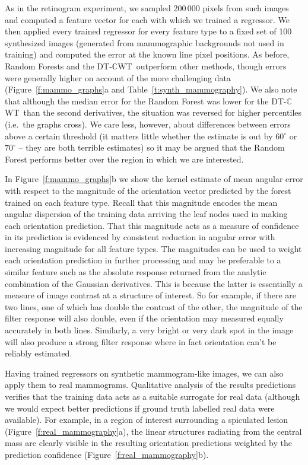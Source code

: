 \documentclass[runningheads,a4paper]{llncs}
\newcommand{\fref}[1]{Figure~\ref{#1}}
\newcommand{\tref}[1]{Table~\ref{#1}}
\def\dtcwt{DT-$\mathbb{C}$WT}
\def\ie{i.e.}
\begin{document}
As in the retinogram experiment, we sampled 200\,000 pixels from such images and computed a feature vector for each with which we trained a regressor. We then applied every trained regressor for every feature type to a fixed set of 100 synthesized images (generated from mammographic backgrounds not used in training)  and computed the error at the known line pixel positions. As before, Random Forests and the \dtcwt~outperform other methods, though errors were generally higher on account of the more challenging data (\fref{f:mammo_graphs}a and \tref{t:synth_mammography}). We also note that although the median error for the Random Forest was lower for the \dtcwt~than the second derivatives, the situation was reversed for higher percentiles (\ie~the graphs cross). We care less, however, about differences between errors above a certain threshold (it matters little whether the estimate is out by $60^\circ$ or $70^\circ$ -- they are both terrible estimates) so it may be argued that the Random Forest performs better over the region in which we are interested.

In \fref{f:mammo_graphs}b we show the kernel estimate of mean angular error with respect to the magnitude of the orientation vector predicted by the forest trained on each feature type. Recall that this magnitude encodes the mean angular dispersion of the training data arriving the leaf nodes used in making each orientation prediction. That this magnitude acts as a measure of confidence in its prediction is evidenced by consistent reduction in angular error with increasing magnitude for all feature types. The magnitudes can be used to weight each orientation prediction in further processing and may be preferable to a similar feature such as the absolute response returned from the analytic combination of the Gaussian derivatives. This is because the latter is essentially a measure of image contrast at a structure of interest. So for example, if there are two lines, one of which has double the contrast of the other, the magnitude of the filter response will also double, even if the orientation may measured equally accurately in both lines. Similarly, a very bright or very dark spot in the image will also produce a strong filter response where in fact orientation can't be reliably estimated.

Having trained regressors on synthetic mammogram-like images, we can also apply them to real mammograms. Qualitative analysis of the results predictions verifies that the training data acts as a suitable surrogate for real data (although we would expect better predictions if ground truth labelled real data were available). For example, in a region of interest surrounding a spiculated lesion (\fref{f:real_mammography}a), the linear structures radiating from the central mass are clearly visible in the resulting orientation predictions weighted by the prediction confidence (\fref{f:real_mammography}b).
\end{document}
